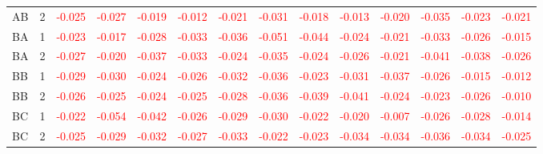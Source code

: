 \begin{table}[!htb]
{\begin{tabular}{llcccccccccccc}
AB & 2 & \textcolor{red}{-0.025} & \textcolor{red}{-0.027} & \textcolor{red}{-0.019} & \textcolor{red}{-0.012} & \textcolor{red}{-0.021} & \textcolor{red}{-0.031} & \textcolor{red}{-0.018} & \textcolor{red}{-0.013} & \textcolor{red}{-0.020} & \textcolor{red}{-0.035} & \textcolor{red}{-0.023} & \textcolor{red}{-0.021}\\
BA & 1 & \textcolor{red}{-0.023} & \textcolor{red}{-0.017} & \textcolor{red}{-0.028} & \textcolor{red}{-0.033} & \textcolor{red}{-0.036} & \textcolor{red}{-0.051} & \textcolor{red}{-0.044} & \textcolor{red}{-0.024} & \textcolor{red}{-0.021} & \textcolor{red}{-0.033} & \textcolor{red}{-0.026} & \textcolor{red}{-0.015}\\
BA & 2 & \textcolor{red}{-0.027} & \textcolor{red}{-0.020} & \textcolor{red}{-0.037} & \textcolor{red}{-0.033} & \textcolor{red}{-0.024} & \textcolor{red}{-0.035} & \textcolor{red}{-0.024} & \textcolor{red}{-0.026} & \textcolor{red}{-0.021} & \textcolor{red}{-0.041} & \textcolor{red}{-0.038} & \textcolor{red}{-0.026}\\
BB & 1 & \textcolor{red}{-0.029} & \textcolor{red}{-0.030} & \textcolor{red}{-0.024} & \textcolor{red}{-0.026} & \textcolor{red}{-0.032} & \textcolor{red}{-0.036} & \textcolor{red}{-0.023} & \textcolor{red}{-0.031} & \textcolor{red}{-0.037} & \textcolor{red}{-0.026} & \textcolor{red}{-0.015} & \textcolor{red}{-0.012}\\
BB & 2 & \textcolor{red}{-0.026} & \textcolor{red}{-0.025} & \textcolor{red}{-0.024} & \textcolor{red}{-0.025} & \textcolor{red}{-0.028} & \textcolor{red}{-0.036} & \textcolor{red}{-0.039} & \textcolor{red}{-0.041} & \textcolor{red}{-0.024} & \textcolor{red}{-0.023} & \textcolor{red}{-0.026} & \textcolor{red}{-0.010}\\
BC & 1 & \textcolor{red}{-0.022} & \textcolor{red}{-0.054} & \textcolor{red}{-0.042} & \textcolor{red}{-0.026} & \textcolor{red}{-0.029} & \textcolor{red}{-0.030} & \textcolor{red}{-0.022} & \textcolor{red}{-0.020} & \textcolor{red}{-0.007} & \textcolor{red}{-0.026} & \textcolor{red}{-0.028} & \textcolor{red}{-0.014}\\
BC & 2 & \textcolor{red}{-0.025} & \textcolor{red}{-0.029} & \textcolor{red}{-0.032} & \textcolor{red}{-0.027} & \textcolor{red}{-0.033} & \textcolor{red}{-0.022} & \textcolor{red}{-0.023} & \textcolor{red}{-0.034} & \textcolor{red}{-0.034} & \textcolor{red}{-0.036} & \textcolor{red}{-0.034} & \textcolor{red}{-0.025}\\
\hline
    \end{tabular}%
    }
\end{table}

